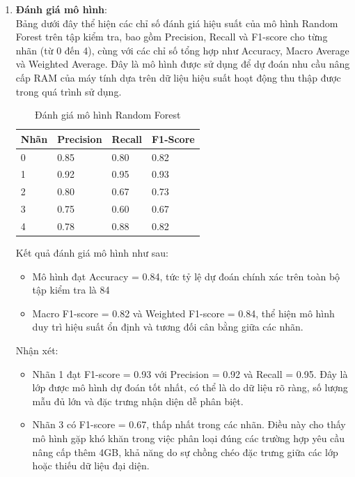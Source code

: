\begin{enumerate}
\begin{itemize}[label=--]
        \item max\_depth: Giới hạn độ sâu tối đa của mỗi cây
        \item min\_samples\_leaf: Số mẫu tối thiểu trong một nút lá
    \end{itemize}
    \item \textbf{Đánh giá mô hình}:\\
    Bảng dưới đây thể hiện các chỉ số đánh giá hiệu suất của mô hình Random Forest trên tập kiểm tra, bao gồm Precision, Recall và F1-score cho từng nhãn (từ 0 đến 4), cùng với các chỉ số tổng hợp như Accuracy, Macro Average và Weighted Average. Đây là mô hình được sử dụng để dự đoán nhu cầu nâng cấp RAM của máy tính dựa trên dữ liệu hiệu suất hoạt động thu thập được trong quá trình sử dụng.
    \begin{longtable}{|p{}|p{}|p{}|p{}|}
    \caption{Đánh giá mô hình Random Forest}\\
    \hline
    \textbf{Nhãn}  & \textbf{Precision} & \textbf{Recall} & \textbf{F1-Score} \\
    \hline
    0 & 0.85 & 0.80 & 0.82 \\
    \hline
    1 & 0.92 & 0.95 & 0.93 \\
    \hline
    2 & 0.80 & 0.67 & 0.73 \\
    \hline
    3 & 0.75 & 0.60 & 0.67 \\
    \hline
    4 & 0.78 & 0.88 & 0.82 \\
    \hline
\end{longtable}
Kết quả đánh giá mô hình như sau:
 \begin{itemize}[label=--]
        \item Mô hình đạt Accuracy = 0.84, tức tỷ lệ dự đoán chính xác trên toàn bộ tập kiểm tra là 84%
        \item Macro F1-score = 0.82 và Weighted F1-score = 0.84, thể hiện mô hình duy trì hiệu suất ổn định và tương đối cân bằng giữa các nhãn.
    \end{itemize}
Nhận xét:
\begin{itemize}[label=--]
        \item Nhãn 1 đạt F1-score = 0.93 với Precision = 0.92 và Recall = 0.95. Đây là lớp được mô hình dự đoán tốt nhất, có thể là do dữ liệu rõ ràng, số lượng mẫu đủ lớn và đặc trưng nhận diện dễ phân biệt.
        \item Nhãn 3 có F1-score = 0.67, thấp nhất trong các nhãn. Điều này cho thấy mô hình gặp khó khăn trong việc phân loại đúng các trường hợp yêu cầu nâng cấp thêm 4GB, khả năng do sự chồng chéo đặc trưng giữa các lớp hoặc thiếu dữ liệu đại diện.

\end{itemize}
\end{enumerate}
